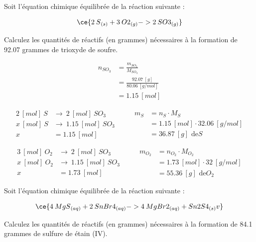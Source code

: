 \documentclass[
  11pt,
  a4paper,
  openany]{book}
\begin{document}
\newpage

\begin{Exercise}

Soit l'équation chimique équilibrée de la réaction suivante :

\[ \ce{ 2\:S{}_{(s)} + 3\:O2{}_{(g)} -> 2\:SO3{}_{(g)} } \]

Calculez les quantités de réactifs (en grammes) nécessaires à la formation de 92.07 grammes de trioxyde de soufre.


\end{Exercise}

\begin{Answer}
\[ \begin{split}
    n_{SO_{3}} &= \frac{m_{SO_{3}}}{M_{SO_{3}}} \\
    &= \frac{92.07\ [g]}{80.06\ [g/mol]} \\
    &= 1.15\ [mol]
    \end{split} \]

\[ \begin{split}
  2\ [mol]\ S &\rightarrow\ 2\ [mol]\ SO_{3} \\
  x\ [mol]\ S &\rightarrow\ 1.15\ [mol]\ SO_{3} \\
  x &= 1.15\ [mol]
  \end{split}
    \qquad
    \begin{split}
    m_{S} &= n_{S} \cdot M_{S} \\
  &= 1.15\ [mol] \cdot 32.06\ [g/mol] \\
  &= 36.87\ [g] \text{ de} S
  \end{split} \]

\[ \begin{split}
    3\ [mol]\ O_2 &\rightarrow\ 2\ [mol]\ SO_{3} \\
    x\ [mol]\ O_2 &\rightarrow\ 1.15\ [mol]\ SO_{3} \\
    x &= 1.73\ [mol]
    \end{split}
    \qquad
    \begin{split}
    m_{O_{2}} &= n_{O_{2}} \cdot M_{O_{2}} \\
    &= 1.73\ [mol] \cdot 32\ [g/mol] \\
    &= 55.36\ [g] \text{ de} O_{2}
  \end{split} \]

\end{Answer}

\begin{Exercise}

Soit l'équation chimique équilibrée de la réaction suivante :

\[ \ce{ 4\:MgS{}_{(aq)} + 2\:SnBr4{}_{(aq)} -> 4\:MgBr2{}_{(aq)} + Sn2S4{}_{(s)} v } \]

Calculez les quantités de réactifs (en grammes) nécessaires à la formation de 84.1 grammes de sulfure de étain (IV).


\end{Exercise}
\end{document}
